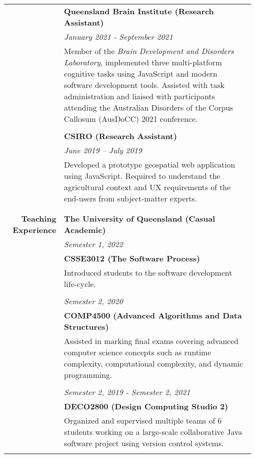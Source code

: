 \documentclass{article}
\begin{document}
\begin{longtable}{>{\columncolor{LeftColumn}}r | p{13cm}}
											& \large\textbf{Queensland Brain Institute (Research Assistant)} \\
											& \textit{January 2021 - September 2021} \\
											& Member of the \textit{Brain Development and Disorders Laboratory}, implemented three multi-platform cognitive tasks using JavaScript and modern software development tools. Assisted with task administration and liaised with participants attending the Australian Disorders of the Corpus Callosum (AusDoCC) 2021 conference. \\ 
											& \\

											& \large\textbf{CSIRO (Research Assistant)} \\
	 										& \textit{June 2019 – July 2019} \\
	 										& Developed a prototype geospatial web application using JavaScript. Required to understand the agricultural context and UX requirements of the end-users from subject-matter experts. \\
	 										& \\
	 										\hline \\

		\large\textbf{Teaching Experience}	& \large\textbf{The University of Queensland (Casual Academic)} \\
											& \textit{Semester 1, 2022} \\
											& \textbf{CSSE3012 (The Software Process)} \\
											& Introduced students to the software development life-cycle. \\
											& \\
											
											& \textit{Semester 2, 2020} \\
											& \textbf{COMP4500 (Advanced Algorithms and Data Structures)} \\
											& Assisted in marking final exams covering advanced computer science concepts such as runtime complexity, computational complexity, and dynamic programming. \\
											& \\

											& \textit{Semester 2, 2019 - Semester 2, 2021} \\
											& \textbf{DECO2800 (Design Computing Studio 2)} \\
											& Organized and supervised multiple teams of 6 students working on a large-scale collaborative Java software project using version control systems. \\
											& \\
											

\end{longtable}
\end{document}
